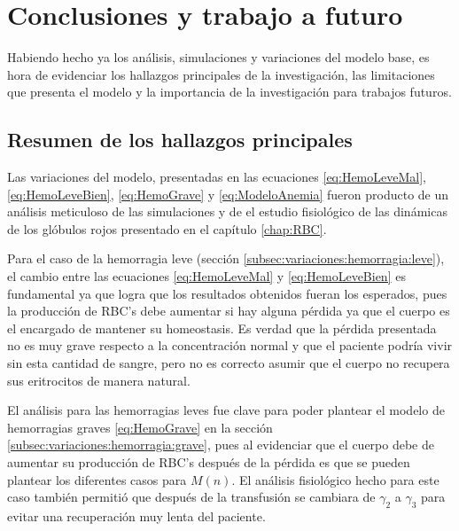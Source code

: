 \chapter{Conclusiones y trabajo a futuro}\label{chap:Conclusiones}

Habiendo hecho ya los análisis, simulaciones y variaciones del modelo base, es hora de evidenciar los hallazgos principales de la investigación, las limitaciones que presenta el modelo y la importancia de la investigación para trabajos futuros.

\section{Resumen de los hallazgos principales}

Las variaciones del modelo, presentadas en las ecuaciones \ref{eq:HemoLeveMal}, \ref{eq:HemoLeveBien}, \ref{eq:HemoGrave} y \ref{eq:ModeloAnemia} fueron producto de un análisis meticuloso de las simulaciones y de el estudio fisiológico de las dinámicas de los glóbulos rojos presentado en el capítulo \ref{chap:RBC}. 

Para el caso de la hemorragia leve (sección \ref{subsec:variaciones:hemorragia:leve}), el cambio entre las ecuaciones \ref{eq:HemoLeveMal} y \ref{eq:HemoLeveBien} es fundamental ya que logra que los resultados obtenidos fueran los esperados, pues la producción de RBC's debe aumentar si hay alguna pérdida ya que el cuerpo es el encargado de mantener su homeostasis. Es verdad que la pérdida presentada no es muy grave respecto a la concentración normal y que el paciente podría vivir sin esta cantidad de sangre, pero no es correcto asumir que el cuerpo no recupera sus eritrocitos de manera natural.

El análisis para las hemorragias leves fue clave para poder plantear el modelo de hemorragias graves \ref{eq:HemoGrave} en la sección \ref{subsec:variaciones:hemorragia:grave}, pues al evidenciar que el cuerpo debe de aumentar su producción de RBC's después de la pérdida es que se pueden plantear los diferentes casos para $M(n)$. El análisis fisiológico hecho para este caso también permitió que después de la transfusión se cambiara de $\gamma_2$ a $\gamma_3$ para evitar una recuperación muy lenta del paciente.

